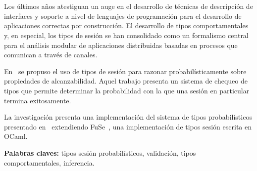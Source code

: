 \chapter*{\runtitulo}

Los últimos años atestiguan un auge en el desarrollo de técnicas de descripción
de interfaces y soporte a nivel de lenguajes de programación para el desarrollo
de aplicaciones correctas por construcción. El desarrollo de tipos
comportamentales y, en especial, los tipos de sesión se han consolidado como un
formalismo central para el análisis modular de aplicaciones distribuidas basadas
en procesos que comunican a través de canales.

En~\cite{DBLP:conf/concur/InversoMPTT20} se propuso el uso de tipos de sesión
para razonar probabilísticamente sobre propiedades de alcanzabilidad. Aquel
trabajo presenta un sistema de chequeo de tipos que permite determinar la
probabilidad con la que una sesión en particular termina exitosamente.

La investigación presenta una implementación del sistema de tipos
probabilísticos presentado en~\cite{DBLP:conf/concur/InversoMPTT20} extendiendo
FuSe~\cite{DBLP:journals/jfp/Padovani17}, una implementación de tipos sesión
escrita en OCaml.

\bigskip

\noindent\textbf{Palabras claves:} tipos sesión probabilísticos, validación, tipos comportamentales, inferencia.
